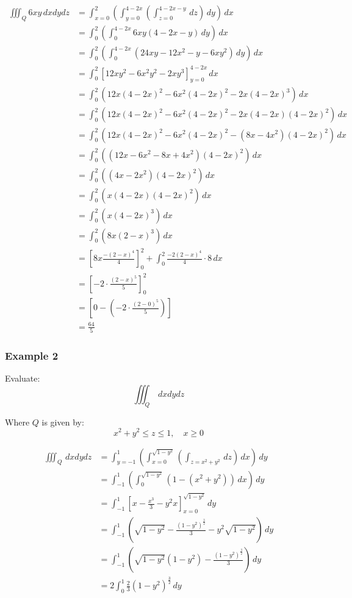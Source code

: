 \documentclass[11pt]{article}
\begin{document}
\begin{align*}
\iiint_Q 6xy \, dx dy dz &= \int_{x = 0}^2 \left( \int_{y = 0}^{4 - 2x} \left( \int_{z = 0}^{4 - 2x - y} \, dz \right) \, dy \right) \, dx \\
&= \int_0^2 \left( \int_0^{4 - 2x} 6xy(4 - 2x - y) \, dy \right) \, dx \\
&= \int_0^2 \left( \int_0^{4 - 2x} (24xy - 12x^2 - y - 6xy^2) \, dy \right) \, dx \\
&= \int_0^2 \left[12xy^2 - 6x^2y^2 - 2xy^3 \right]_{y = 0}^{4 - 2x} \, dx \\
&= \int_0^2 \left(12x(4 - 2x)^2 - 6x^2(4 - 2x)^2 - 2x(4 - 2x)^3 \right) \, dx \\
&= \int_0^2 \left(12x(4 - 2x)^2 - 6x^2(4 - 2x)^2 - 2x(4 - 2x)(4 - 2x)^2 \right) \, dx \\
&= \int_0^2 \left(12x(4 - 2x)^2 - 6x^2(4 - 2x)^2 - (8x - 4x^2)(4 - 2x)^2 \right) \, dx \\
&= \int_0^2 \left((12x - 6x^2 - 8x + 4x^2)(4 - 2x)^2 \right) \, dx \\
&= \int_0^2 \left((4x - 2x^2)(4 - 2x)^2 \right) \, dx \\
&= \int_0^2 \left(x(4 - 2x)(4 - 2x)^2 \right) \, dx \\
&= \int_0^2 \left(x(4 - 2x)^3 \right) \, dx \\
&= \int_0^2 \left(8x(2 - x)^3 \right) \, dx \\
&= \left[8x \frac{-(2 - x)^4}{4} \right]_0^2 + \int_0^2 \frac{-2(2 - x)^4}{4} \cdot 8 \, dx \\
&= \left[-2 \cdot \frac{(2 - x)^5}{5} \right]_0^2 \\
&= \left[0 - \left(- 2 \cdot \frac{(2 - 0)^5}{5} \right) \right] \\
&= \frac{64}{5}
\end{align*}

\subsubsection{Example 2}
\label{sec:org9ab8410}
Evaluate:
\[\iiint_Q \, dx dy dz\]

Where \(Q\) is given by:
\[x^2 + y^2 \le z \le 1, \quad x \ge 0\]

\begin{align*}
\iiint_Q \, dx dy dz &= \int_{y = -1}^1 \left( \int_{x = 0}^{\sqrt{1 - y^2}} \left( \int_{z = x^2 + y^2} \, dz \right) \, dx \right) \, dy \\
&= \int_{-1}^{1} \left( \int_{0}^{\sqrt{1 - y^2}} (1 - (x^2 + y^2)) \, dx \right) \, dy \\
&= \int_{-1}^1 \left[x - \frac{x^3}{3} - y^2 x \right]_{x = 0}^{\sqrt{1 - y^2}} \, dy \\
&= \int_{-1}^1 \left(\sqrt{1 - y^2} - \frac{(1 - y^2)^{\frac{3}{2}}}{3} - y^2 \sqrt{1 - y^2} \right) \, dy \\
&= \int_{-1}^1 \left( \sqrt{1 - y^2} (1- y^2) - \frac{(1- y^2)^{\frac{3}{2}}}{3} \right) \, dy \\
&= 2 \int_0^1 \frac{2}{3} (1 - y^2)^{\frac{3}{2}} \, dy
\end{align*}
\end{document}
